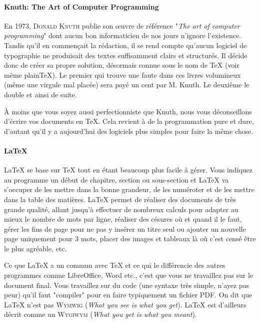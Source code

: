 \documentclass{../fiche}
\begin{document}
\vspace{-.4cm}

\paragraph{Knuth: The Art of Computer Programming}
En 1973, \textsc{Donald Knuth} publie son \oe uvre de référence "\textit{The art of computer programming}" dont aucun bon informaticien de nos jours n'ignore l'existence. Tandis qu'il en commençait la rédaction, il se rend compte qu'aucun logiciel de typographie ne produisait des textes suffisamment clairs et structurés. Il décide donc de créer sa propre solution, désormais connue sous le nom de \TeX{} (voir même plain\TeX). 
Le premier qui trouve une faute dans ces livres volumineux (même une virgule mal placée) sera payé un cent par M. Knuth. Le deuxième le double et ainsi de suite.

À moins que vous soyez aussi perfectionniste que Knuth, nous vous déconseillons d'écrire vos documents en \TeX. Cela revient à de la programmation pure et dure, d'autant qu'il y a aujourd'hui des logiciels plus simples pour faire la même chose.

\paragraph{LaTeX}
\LaTeX{} se base sur \TeX{} tout en étant beaucoup plus facile à gérer. Vous indiquez au programme un début de chapitre, section ou sous-section et \LaTeX{} va s'occuper de les mettre dans la bonne grandeur, de les numéroter et de les mettre dans la table des matières. \LaTeX{} permet de réaliser des documents de très grande qualité, allant jusqu'à effectuer de nombreux calculs pour adapter au mieux le nombre de mots par ligne, réaliser des césures où et quand il le faut, gérer les fins de page pour ne pas y insérer un titre seul ou ajouter un nouvelle page uniquement pour 3 mots, placer des images et tableaux là où c'est censé être le plus agréable, etc.

Ce que \LaTeX{} a un commun avec \TeX{} et ce qui le différencie des autres programmes comme LibreOffice, Word etc., c'est que vous ne travaillez pas sur le document final. Vous travaillez sur du code (une syntaxe très simple, n'ayez pas peur) qu'il faut "compiler" pour en faire typiquement un fichier PDF. On dit que \LaTeX{} n'est pas \textsc{Wysiwig} (\textit{What you see is what you get}). %
\LaTeX{} est d'ailleurs décrit comme un \textsc{Wygiwym} (\textit{What you get is what you meant}).
\end{document}

